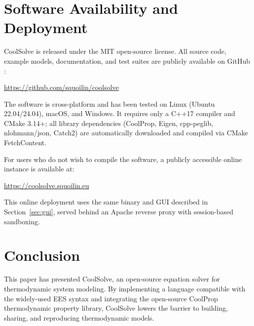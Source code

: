 \documentclass[review,3p]{elsarticle}
\begin{document}
\section{Software Availability and Deployment}
\label{sec:availability}

CoolSolve is released under the MIT open-source license. All source code, example models, documentation, and test suites are publicly available on GitHub \cite{CoolSolve2026}:
\begin{center}
    \url{https://github.com/squoilin/coolsolve}
\end{center}

The software is cross-platform and has been tested on Linux (Ubuntu 22.04/24.04), macOS, and Windows. It requires only a C++17 compiler and CMake 3.14+; all library dependencies (CoolProp, Eigen, cpp-peglib, nlohmann/json, Catch2) are automatically downloaded and compiled via CMake FetchContent.

For users who do not wish to compile the software, a publicly accessible online instance is available at:
\begin{center}
    \url{https://coolsolve.squoilin.eu}
\end{center}
This online deployment uses the same binary and GUI described in Section~\ref{sec:gui}, served behind an Apache reverse proxy with session-based sandboxing.

\section{Conclusion}
\label{sec:conclusion}

This paper has presented CoolSolve, an open-source equation solver for thermodynamic system modeling. By implementing a language compatible with the widely-used EES syntax and integrating the open-source CoolProp thermodynamic property library, CoolSolve lowers the barrier to building, sharing, and reproducing thermodynamic models.
\end{document}
